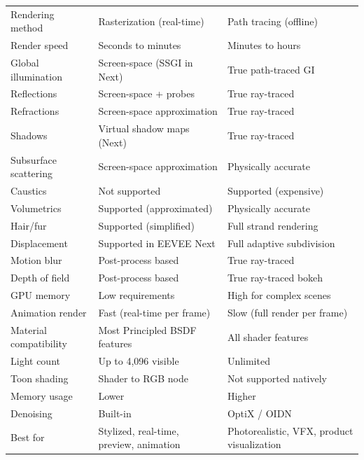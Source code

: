 \begin{center}
\begin{tabularx}{\textwidth}{L{3.8cm}XX}
\toprule
{}
 &  &  \\
\midrule
Rendering method & Rasterization (real-time) & Path tracing (offline) \\
Render speed & Seconds to minutes & Minutes to hours \\
Global illumination & Screen-space (SSGI in Next) & True path-traced GI \\
Reflections & Screen-space + probes & True ray-traced \\
Refractions & Screen-space approximation & True ray-traced \\
Shadows & Virtual shadow maps (Next) & True ray-traced \\
Subsurface scattering & Screen-space approximation & Physically accurate \\
Caustics & Not supported & Supported (expensive) \\
Volumetrics & Supported (approximated) & Physically accurate \\
Hair/fur & Supported (simplified) & Full strand rendering \\
Displacement & Supported in EEVEE Next & Full adaptive subdivision \\
Motion blur & Post-process based & True ray-traced \\
Depth of field & Post-process based & True ray-traced bokeh \\
GPU memory & Low requirements & High for complex scenes \\
Animation render & Fast (real-time per frame) & Slow (full render per frame) \\
Material compatibility & Most Principled BSDF features & All shader features \\
Light count & Up to 4,096 visible & Unlimited \\
Toon shading & Shader to RGB node & Not supported natively \\
Memory usage & Lower & Higher \\
Denoising & Built-in & OptiX / OIDN \\
Best for & Stylized, real-time, preview, animation & Photorealistic, VFX, product visualization \\
\bottomrule
\end{tabularx}
\end{center}

